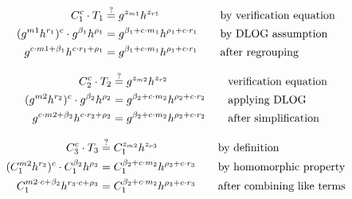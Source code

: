 \begin{align}
    C_1^c \cdot T_1 &\stackrel{?}{=} g^{z_{m1}} h^{z_{r1}} &&\quad\text{by verification equation} \notag \\
    (g^{m1}h^{r_1})^c \cdot g^{\beta_1}h^{\rho_1} &= g^{\beta_1 + c \cdot m_1} h^{\rho_1 + c \cdot r_1} &&\quad\text{by DLOG assumption} \label{eq:1} \\
    g^{c \cdot m1 + \beta_1}h^{c \cdot r_1 + \rho_1} &= g^{\beta_1 + c \cdot m_1} h^{\rho_1 + c \cdot r_1} &&\quad\text{after regrouping} \notag
\end{align}

\begin{align}
    C_2^c \cdot T_2 &\stackrel{?}{=} g^{z_{m2}} h^{z_{r2}} &&\quad\text{verification equation} \notag \\
    (g^{m2}h^{r_2})^c \cdot g^{\beta_2}h^{\rho_2} &= g^{\beta_2 + c \cdot m_2} h^{\rho_2 + c \cdot r_2} &&\quad\text{applying DLOG} \label{eq:2} \\
    g^{c \cdot m2 + \beta_2}h^{c \cdot r_2 + \rho_2} &= g^{\beta_2 + c \cdot m_2} h^{\rho_2 + c \cdot r_2} &&\quad\text{after simplification} \notag
\end{align}

\begin{align}
    C_3^c \cdot T_3 &\stackrel{?}{=} C_1^{z_{m2}} h^{z_{r3}} &&\quad\text{by definition} \notag \\
    (C_1^{m2}h^{r_3})^c \cdot C_1^{\beta_2}h^{\rho_3} &= C_1^{\beta_2 + c \cdot m_2} h^{\rho_3 + c \cdot r_3} &&\quad\text{by homomorphic property} \label{eq:3} \\
    C_1^{m2 \cdot c + \beta_2}h^{r_3 \cdot c + \rho_3} &= C_1^{\beta_2 + c \cdot m_2} h^{\rho_3 + c \cdot r_3} &&\quad\text{after combining like terms} \notag
\end{align}